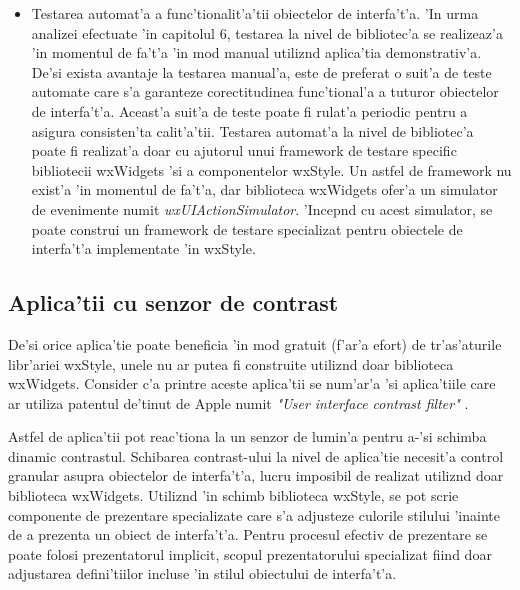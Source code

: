 \begin{itemize}
\item Testarea automat'a a func'tionalit'a'tii obiectelor de interfa't'a. 'In urma analizei efectuate 'in capitolul 6, testarea la nivel de bibliotec'a se realizeaz'a 'in momentul de fa't'a 'in mod manual utiliz{\ia}nd aplica'tia demonstrativ'a. De'si exista avantaje la testarea manual'a, este de preferat o suit'a de teste automate care s'a garanteze corectitudinea func'tional'a a tuturor obiectelor de interfa't'a. Aceast'a suit'a de teste poate fi rulat'a periodic pentru a asigura consisten'ta calit'a'tii. Testarea automat'a la nivel de bibliotec'a poate fi realizat'a doar cu ajutorul unui framework de testare specific bibliotecii wxWidgets 'si a componentelor wxStyle. Un astfel de framework nu exist'a 'in momentul de fa't'a, dar biblioteca wxWidgets ofer'a un simulator de evenimente numit \emph{wxUIActionSimulator}. 'Incep{\ia}nd cu acest simulator, se poate construi un framework de testare specializat pentru obiectele de interfa't'a implementate 'in wxStyle.
\end{itemize}

\subsection{Aplica'tii cu senzor de contrast}
De'si orice aplica'tie poate beneficia 'in mod gratuit (f'ar'a efort) de tr'as'aturile libr'ariei wxStyle, unele nu ar putea fi construite utiliz{\ia}nd doar biblioteca wxWidgets. Consider c'a printre aceste aplica'tii se num'ar'a 'si aplica'tiile care ar utiliza patentul de'tinut de Apple numit \emph{"User interface contrast filter"} \cite{uicontrast}. 

\medskip

Astfel de aplica'tii pot reac'tiona la un senzor de lumin'a pentru a-'si schimba dinamic contrastul. Schibarea contrast-ului la nivel de aplica'tie necesit'a control granular asupra obiectelor de interfa't'a, lucru imposibil de realizat utiliz{\ia}nd doar biblioteca wxWidgets. Utiliz{\ia}nd 'in schimb biblioteca wxStyle, se pot scrie componente de prezentare specializate care s'a adjusteze culorile stilului 'inainte de a prezenta un obiect de interfa't'a. Pentru procesul efectiv de prezentare se poate folosi prezentatorul implicit, scopul prezentatorului specializat fiind doar adjustarea defini'tiilor incluse 'in stilul obiectului de interfa't'a.